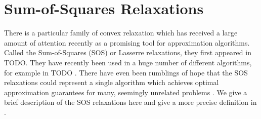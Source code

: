 \section{Sum-of-Squares Relaxations}
There is a particular family of convex relaxation which has received a large amount of attention recently as a promising tool for approximation algorithms. Called the Sum-of-Squares (SOS) or Lasserre relaxations, they first appeared in TODO\cite{}. They have recently been used in a huge number of different algorithms, for example in TODO \cite{}. There have even been rumblings of hope that the SOS relaxations could represent a single algorithm which achieves optimal approximation guarantees for many, seemingly unrelated problems \cite{barak,steurer}. We give a brief description of the SOS relaxations here and give a more precise definition in . 

